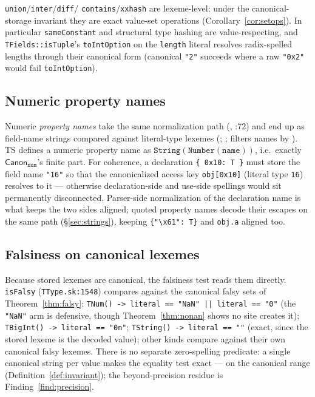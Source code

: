\documentclass[11pt]{article}
\newcommand{\Canon}[1]{\mathsf{Canon}_{\texttt{#1}}}
\begin{document}
\texttt{union}/\texttt{inter}/\texttt{diff}/%
\texttt{contains}/\texttt{xxhash} are lexeme-level; under the
canonical-storage invariant they are exact value-set operations
(Corollary~\ref{cor:setops}). In particular \texttt{sameConstant} and
structural type hashing are value-respecting, and
\texttt{TFields::isTuple}'s \texttt{toIntOption} on the \texttt{length}
literal resolves radix-spelled lengths through their canonical form
(canonical \texttt{"2"} succeeds where a raw \texttt{"0x2"} would fail
\texttt{toIntOption}).

\subsection{Numeric property names}
\label{sec:propnames}

Numeric \emph{property names} take the same normalization path
(, :72) and end
up as field-name strings compared against literal-type lexemes
(; ;
 filters names by
). TS defines a numeric property name as
$\mathtt{String(Number(name))}$, i.e.\ exactly $\Canon{num}$'s finite
part. For coherence, a declaration \texttt{\{ 0x10: T \}} must store the
field name \texttt{"16"} so that the canonicalized access key
\texttt{obj[0x10]} (literal type \texttt{16}) resolves to it ---
otherwise declaration-side and use-side spellings would sit permanently
disconnected. Parser-side normalization of the declaration name is what
keeps the two sides aligned; quoted property names decode their escapes
on the same path (\S\ref{sec:strings}), keeping
\texttt{\{"\textbackslash x61": T\}} and \texttt{obj.a} aligned too.

\subsection{Falsiness on canonical lexemes}

Because stored lexemes are canonical, the falsiness test reads them
directly. \texttt{isFalsy} (\texttt{TType.sk:1548}) compares against the
canonical falsy sets of Theorem~\ref{thm:falsy}: \texttt{TNum() ->
literal == "NaN" || literal == "0"} (the \texttt{"NaN"} arm is
defensive, though Theorem~\ref{thm:nonan} shows no site creates it);
\texttt{TBigInt() -> literal == "0n"}; \texttt{TString() -> literal ==
""} (exact, since the stored lexeme is the decoded value); other kinds
compare against their own canonical falsy lexemes. There is no separate
zero-spelling predicate: a single canonical string per value makes the
equality test exact --- on the canonical range
(Definition~\ref{def:invariant}); the beyond-precision residue is
Finding~\ref{find:precision}.
\end{document}
